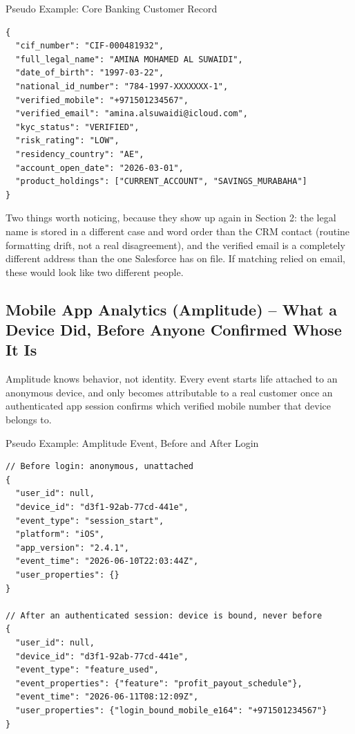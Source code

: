 \documentclass[11pt]{article}
\begin{document}
\begin{datarecord}{Pseudo Example: Core Banking Customer Record}
\begin{lstlisting}[basicstyle=\ttfamily\scriptsize\color{malcodetext}]
{
  "cif_number": "CIF-000481932",
  "full_legal_name": "AMINA MOHAMED AL SUWAIDI",
  "date_of_birth": "1997-03-22",
  "national_id_number": "784-1997-XXXXXXX-1",
  "verified_mobile": "+971501234567",
  "verified_email": "amina.alsuwaidi@icloud.com",
  "kyc_status": "VERIFIED",
  "risk_rating": "LOW",
  "residency_country": "AE",
  "account_open_date": "2026-03-01",
  "product_holdings": ["CURRENT_ACCOUNT", "SAVINGS_MURABAHA"]
}
\end{lstlisting}
\end{datarecord}

Two things worth noticing, because they show up again in Section 2: the legal name is stored in a different case and word order than the CRM contact (routine formatting drift, not a real disagreement), and the verified email is a completely different address than the one Salesforce has on file. If matching relied on email, these would look like two different people.

\subsection{Mobile App Analytics (Amplitude) -- What a Device Did, Before Anyone Confirmed Whose It Is}
Amplitude knows behavior, not identity. Every event starts life attached to an anonymous device, and only becomes attributable to a real customer once an authenticated app session confirms which verified mobile number that device belongs to.

\begin{datarecord}{Pseudo Example: Amplitude Event, Before and After Login}
\begin{lstlisting}[basicstyle=\ttfamily\scriptsize\color{malcodetext}]
// Before login: anonymous, unattached
{
  "user_id": null,
  "device_id": "d3f1-92ab-77cd-441e",
  "event_type": "session_start",
  "platform": "iOS",
  "app_version": "2.4.1",
  "event_time": "2026-06-10T22:03:44Z",
  "user_properties": {}
}

// After an authenticated session: device is bound, never before
{
  "user_id": null,
  "device_id": "d3f1-92ab-77cd-441e",
  "event_type": "feature_used",
  "event_properties": {"feature": "profit_payout_schedule"},
  "event_time": "2026-06-11T08:12:09Z",
  "user_properties": {"login_bound_mobile_e164": "+971501234567"}
}
\end{lstlisting}
\end{datarecord}
\end{document}
